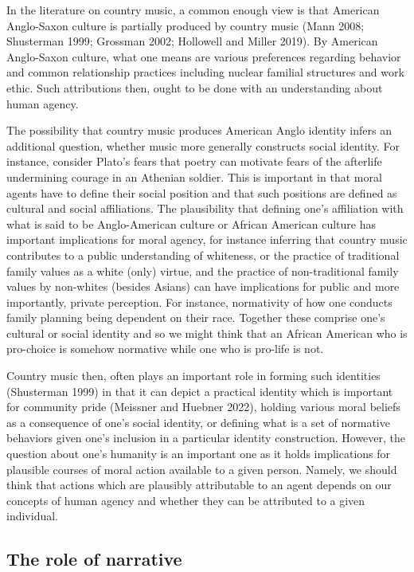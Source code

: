 \documentclass[
  letterpaper,
  DIV=11,
  numbers=noendperiod]{scrartcl}
\theoremstyle{remark}
\begin{document}
In the literature on country music, a common enough view is that
American Anglo-Saxon culture is partially produced by country music
(Mann 2008; Shusterman 1999; Grossman 2002; Hollowell and Miller 2019).
By American Anglo-Saxon culture, what one means are various preferences
regarding behavior and common relationship practices including nuclear
familial structures and work ethic. Such attributions then, ought to be
done with an understanding about human agency.

The possibility that country music produces American Anglo identity
infers an additional question, whether music more generally constructs
social identity. For instance, consider Plato's fears that poetry can
motivate fears of the afterlife undermining courage in an Athenian
soldier. This is important in that moral agents have to define their
social position and that such positions are defined as cultural and
social affiliations. The plausibility that defining one's affiliation
with what is said to be Anglo-American culture or African American
culture has important implications for moral agency, for instance
inferring that country music contributes to a public understanding of
whiteness, or the practice of traditional family values as a white
(only) virtue, and the practice of non-traditional family values by
non-whites (besides Asians) can have implications for public and more
importantly, private perception. For instance, normativity of how one
conducts family planning being dependent on their race. Together these
comprise one's cultural or social identity and so we might think that an
African American who is pro-choice is somehow normative while one who is
pro-life is not.

Country music then, often plays an important role in forming such
identities (Shusterman 1999) in that it can depict a practical identity
which is important for community pride (Meissner and Huebner 2022),
holding various moral beliefs as a consequence of one's social identity,
or defining what is a set of normative behaviors given one's inclusion
in a particular identity construction. However, the question about one's
humanity is an important one as it holds implications for plausible
courses of moral action available to a given person. Namely, we should
think that actions which are plausibly attributable to an agent depends
on our concepts of human agency and whether they can be attributed to a
given individual.

\subsection{The role of narrative}\label{the-role-of-narrative}
\end{document}
